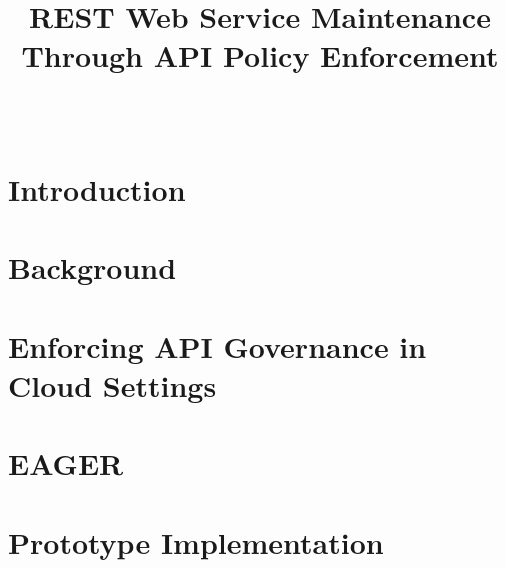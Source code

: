 \documentclass[journal]{IEEEtran}
\begin{document}
\title{REST Web Service Maintenance Through API Policy Enforcement}

\author{\\
}\maketitle

\begin{abstract}

\end{abstract}




\section{Introduction}
\label{sec:intro}


\section{Background}
\label{sec:bg}


\section{Enforcing API Governance in Cloud Settings}
\label{sec:enforce}


\section{EAGER}
\label{sec:eager}


\section{Prototype Implementation}
\label{sec:prototype_impl}

\end{document}
